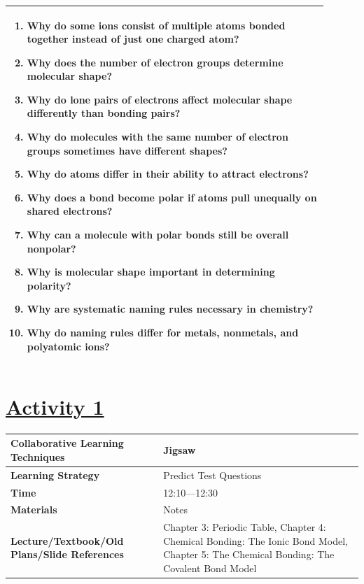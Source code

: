 \documentclass{article}
\begin{document}
{\begin{tabular}{|p{0.9\linewidth}|}
\begin{enumerate}
\item Why do some ions consist of multiple atoms bonded together instead of just one charged atom?  
\item Why does the number of electron groups determine molecular shape?  
\item Why do lone pairs of electrons affect molecular shape differently than bonding pairs?  
\item Why do molecules with the same number of electron groups sometimes have different shapes?  
\item Why do atoms differ in their ability to attract electrons?  
\item Why does a bond become polar if atoms pull unequally on shared electrons?  
\item Why can a molecule with polar bonds still be overall nonpolar?  
\item Why is molecular shape important in determining polarity?  
\item Why are systematic naming rules necessary in chemistry?  
\item Why do naming rules differ for metals, nonmetals, and polyatomic ions?  
\end{enumerate} \\
\hline
\end{tabular}


\section*{\underline{Activity 1}}
\vspace{0.2cm}
\begin{tabular}{|p{4.2cm}|p{9.8cm}|}
\hline
\textbf{Collaborative Learning Techniques} & Jigsaw\\
\hline
\textbf{Learning Strategy} & Predict Test Questions \\
\hline
\textbf{Time} & 12:10---12:30\\
\hline
\textbf{Materials} & Notes \\
\hline
\textbf{Lecture/Textbook/Old Plans/Slide References} & Chapter 3: Periodic Table, Chapter 4: Chemical Bonding: The Ionic Bond Model, Chapter 5: The Chemical Bonding: The Covalent Bond Model\\
\hline
\end{tabular}
\vspace{0.5cm}

}
\end{document}
